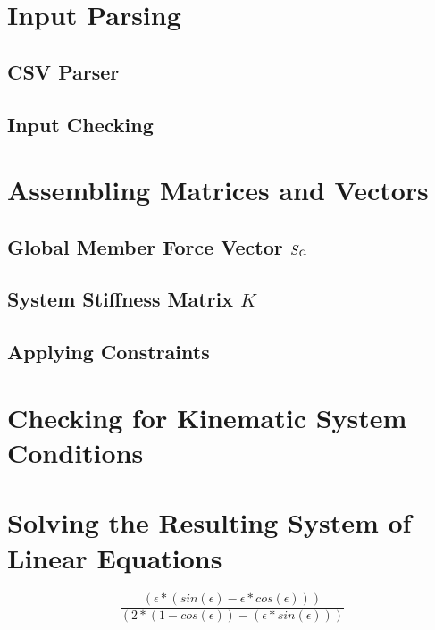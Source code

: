 \section{Input Parsing}
\label{sec:inputpars}

\subsection{CSV Parser}
\label{sec:csvparse}

\subsection{Input Checking}
\label{sec:inputcheck}


\section{Assembling Matrices and Vectors}
\label{sec:asmmatrvec}

\subsection{Global Member Force Vector $S\textsubscript{G}$}
\label{sec:asmSG}

\subsection{System Stiffness Matrix $K$}
\label{sec:asmK}

\subsection{Applying Constraints}
\label{sec:applyconst}


\section{Checking for Kinematic System Conditions}
\label{sec:kinesyscheck}


\section{Solving the Resulting System of Linear Equations}
\label{sec:solver}




\begin{equation} \label{constA}
\frac{(\epsilon * (sin(\epsilon) - \epsilon * cos(\epsilon)))}
{(2 * (1 - cos(\epsilon)) - (\epsilon * sin(\epsilon)))}
\end{equation}